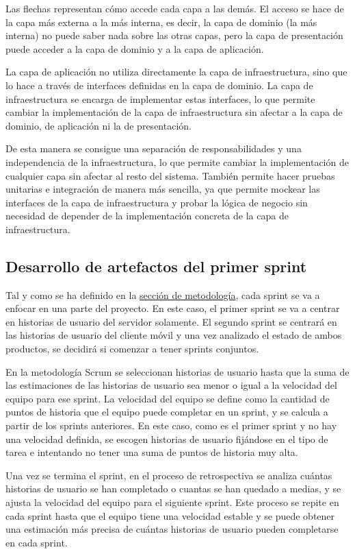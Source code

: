 Las flechas representan cómo accede cada capa a las demás.
El acceso se hace de la capa más externa a la más interna, es decir, la capa de dominio (la más interna) no puede saber nada sobre las otras capas, pero la capa de presentación puede acceder a la capa de dominio y a la capa de aplicación.

La capa de aplicación no utiliza directamente la capa de infraestructura, sino que lo hace a través de interfaces definidas en la capa de dominio. La capa de infraestructura se encarga de implementar estas interfaces, lo que permite cambiar la implementación de la capa de infraestructura sin afectar a la capa de dominio, de aplicación ni la de presentación.

De esta manera se consigue una separación de responsabilidades y una independencia de la infraestructura, lo que permite cambiar la implementación de cualquier capa sin afectar al resto del sistema.
También permite hacer pruebas unitarias e integración de manera más sencilla, ya que permite \gls{mockear} las interfaces de la capa de infraestructura y probar la lógica de negocio sin necesidad de depender de la implementación concreta de la capa de infraestructura.

\subsection{Desarrollo de artefactos del primer sprint}
Tal y como se ha definido en la \hyperref[sec:metodologia]{sección de metodología}, cada sprint se va a enfocar en una parte del proyecto. En este caso, el primer sprint se va a centrar en historias de usuario del servidor solamente. El segundo sprint se centrará en las historias de usuario del cliente móvil y una vez analizado el estado de ambos productos, se decidirá si comenzar a tener sprints conjuntos.

En la metodología Scrum se seleccionan historias de usuario hasta que la suma de las estimaciones de las historias de usuario sea menor o igual a la velocidad del equipo para ese sprint.
La velocidad del equipo se define como la cantidad de puntos de historia que el equipo puede completar en un sprint, y se calcula a partir de los sprints anteriores.
En este caso, como es el primer sprint y no hay una velocidad definida, se escogen historias de usuario fijándose en el tipo de tarea e intentando no tener una suma de puntos de historia muy alta.

Una vez se termina el sprint, en el proceso de retrospectiva se analiza cuántas historias de usuario se han completado o cuantas se han quedado a medias, y se ajusta la velocidad del equipo para el siguiente sprint. Este proceso se repite en cada sprint hasta que el equipo tiene una velocidad estable y se puede obtener una estimación más precisa de cuántas historias de usuario pueden completarse en cada sprint.

